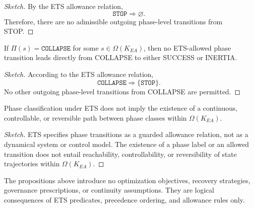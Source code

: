 \begin{proof}[Sketch]
By the ETS allowance relation,
\[
\texttt{STOP} \Rightarrow \varnothing .
\]
Therefore, there are no admissible outgoing phase-level transitions from STOP.
\end{proof}

\begin{proposition}
\label{prop:collapse-no-return}
If $\Pi(s)=\texttt{COLLAPSE}$ for some $s \in \Omega(K_{EA})$, then no ETS-allowed
phase transition leads directly from COLLAPSE to either SUCCESS or INERTIA.
\end{proposition}

\begin{proof}[Sketch]
According to the ETS allowance relation,
\[
\texttt{COLLAPSE} \Rightarrow \{\texttt{STOP}\}.
\]
No other outgoing phase-level transitions from COLLAPSE are permitted.
\end{proof}

\begin{proposition}
\label{prop:non-steerable}
Phase classification under ETS does not imply the existence of a continuous,
controllable, or reversible path between phase classes within
$\Omega(K_{EA})$.
\end{proposition}

\begin{proof}[Sketch]
ETS specifies phase transitions as a guarded allowance relation, not as a
dynamical system or control model. The existence of a phase label or an allowed
transition does not entail reachability, controllability, or reversibility of
state trajectories within $\Omega(K_{EA})$.
\end{proof}

\begin{remark}
The propositions above introduce no optimization objectives, recovery strategies,
governance prescriptions, or continuity assumptions. They are logical
consequences of ETS predicates, precedence ordering, and allowance rules only.
\end{remark}

